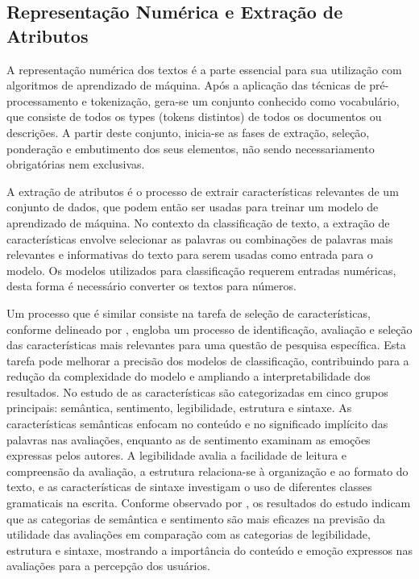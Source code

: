 \subsection{Representação Numérica e Extração de Atributos}\label{subsec:representacaonumerica}

A representação numérica dos textos é a parte essencial para sua utilização com algoritmos de aprendizado de máquina.  Após a aplicação das técnicas de pré-processamento e tokenização, gera-se um conjunto conhecido como vocabulário, que consiste de todos os types (tokens distintos) de todos os documentos ou descrições.  A partir deste conjunto, inicia-se as fases de extração, seleção, ponderação e embutimento dos seus elementos, não sendo necessariamento obrigatórias nem exclusivas.  

A extração de atributos é o processo de extrair características relevantes de um conjunto de dados, que podem então ser usadas para treinar um modelo de aprendizado de máquina. No contexto da classificação de texto, a extração de características envolve selecionar as palavras ou combinações de palavras mais relevantes e informativas do texto para serem usadas como entrada para o modelo.  Os modelos utilizados para classificação requerem entradas numéricas, desta forma é necessário converter os textos para números.

Um processo que é similar consiste na tarefa de seleção de características, conforme delineado por \cite{du2019feature}, engloba um processo de identificação, avaliação e seleção das características mais relevantes para uma questão de pesquisa específica. Esta tarefa pode melhorar a precisão dos modelos de classificação, contribuindo para a redução da complexidade do modelo e ampliando a interpretabilidade dos resultados.  No estudo de \cite{du2019feature} as características são categorizadas em cinco grupos principais: semântica, sentimento, legibilidade, estrutura e sintaxe.  
As características semânticas enfocam no conteúdo e no significado implícito das palavras nas avaliações, enquanto as de sentimento examinam as emoções expressas pelos autores. A legibilidade avalia a facilidade de leitura e compreensão da avaliação, a estrutura relaciona-se à organização e ao formato do texto, e as características de sintaxe investigam o uso de diferentes classes gramaticais na escrita. 
Conforme observado por \cite{du2019feature}, os resultados do estudo indicam que as categorias de semântica e sentimento são mais eficazes na previsão da utilidade das avaliações em comparação com as categorias de legibilidade, estrutura e sintaxe, mostrando a importância do conteúdo e emoção expressos nas avaliações para a percepção dos usuários.

